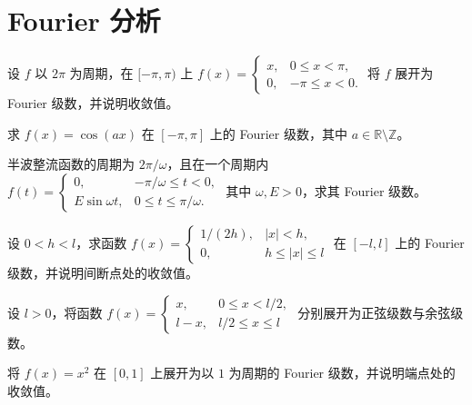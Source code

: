 \renewcommand{\thesection}{\arabic{section}}\renewcommand{\theHsection}{chapter.\arabic{section}}\setcounter{section}{11}\section{Fourier 分析}
\noindent\begin{minipage}{\textwidth}
设 $f$ 以 $2\pi$ 为周期，在 $[-\pi,\pi)$ 上 $f(x)=\begin{cases}x,&0\le x<\pi,\\0,&-\pi\le x<0.\end{cases}$ 将 $f$ 展开为 Fourier 级数，并说明收敛值。
\end{minipage}\par\vfill
\noindent\begin{minipage}{\textwidth}
求 $f(x)=\cos(ax)$ 在 $[-\pi,\pi]$ 上的 Fourier 级数，其中 $a\in\mathbb R\setminus\mathbb Z$。
\end{minipage}\par\vfill
\noindent\begin{minipage}{\textwidth}
半波整流函数的周期为 $2\pi/\omega$，且在一个周期内 $f(t)=\begin{cases}0,&-\pi/\omega\le t<0,\\E\sin\omega t,&0\le t\le\pi/\omega.\end{cases}$ 其中 $\omega,E>0$，求其 Fourier 级数。
\end{minipage}\par\vfill
\noindent\begin{minipage}{\textwidth}
设 $0<h<l$，求函数 $f(x)=\begin{cases}1/(2h),&|x|<h,\\0,&h\le|x|\le l\end{cases}$ 在 $[-l,l]$ 上的 Fourier 级数，并说明间断点处的收敛值。
\end{minipage}\par\vfill
\newpage
\noindent\begin{minipage}{\textwidth}
设 $l>0$，将函数 $f(x)=\begin{cases}x,&0\le x<l/2,\\l-x,&l/2\le x\le l\end{cases}$ 分别展开为正弦级数与余弦级数。
\end{minipage}\par\vfill
\noindent\begin{minipage}{\textwidth}
将 $f(x)=x^2$ 在 $[0,1]$ 上展开为以 $1$ 为周期的 Fourier 级数，并说明端点处的收敛值。
\end{minipage}\par\vfill
